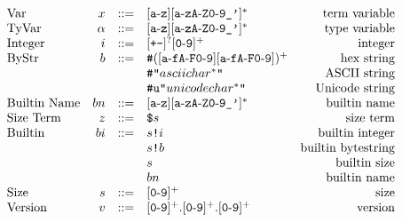 \documentclass[../main.tex]{subfiles}
\begin{document}
\begin{figure*}[t]
    \centering
    \[\begin{array}{lrclr}
        \textrm{Var}     & x  & ::= & [\texttt{a}\!\hyphen{}\!\texttt{z}][\texttt{a}\!\hyphen{}\!\texttt{zA}\!\hyphen{}\!\texttt{Z0}\!\hyphen{}\!\texttt{9\_'}]^*                                                           & \textrm{term variable}\\
        \textrm{TyVar}   & \alpha & ::= & [\texttt{a}\!\hyphen{}\!\texttt{z}][\texttt{a}\!\hyphen{}\!\texttt{zA}\!\hyphen{}\!\texttt{Z0}\!\hyphen{}\!\texttt{9\_'}]^*                                                      & \textrm{type variable}\\
        \textrm{Integer} & i  & ::= & [\texttt{+-}]^?[\texttt{0}\!\hyphen{}\!\texttt{9}]^+                                                                                                                                  & \textrm{integer}\\
        \textrm{ByStr}   & b  & ::= & \texttt{\#}([\texttt{a}\!\hyphen{}\!\texttt{fA}\!\hyphen{}\!\texttt{F0}\!\hyphen{}\!\texttt{9}][\texttt{a}\!\hyphen{}\!\texttt{fA}\!\hyphen{}\!\texttt{F0}\!\hyphen{}\!\texttt{9}])^+ & \textrm{hex string}\\
                         &    &     & \texttt{\#"}asciichar^*\texttt{"}   & \textrm{ASCII string}\\
                         &    &     & \texttt{\#u"}unicodechar^*\texttt{"}    & \textrm{Unicode string}\\
        \textrm{Builtin Name}    & bn  & ::= & [\texttt{a}\!\hyphen{}\!\texttt{z}][\texttt{a}\!\hyphen{}\!\texttt{zA}\!\hyphen{}\!\texttt{Z0}\!\hyphen{}\!\texttt{9\_'}]^*                                                          & \textrm{builtin name}\\
        \textrm{Size Term} & z  & ::= & \texttt{\$} s & \textrm{size term}\\
        \textrm{Builtin} & bi & ::= & \sizedBuiltin{s}{i} & \textrm{builtin integer}\\
                         &    &     & \sizedBuiltin{s}{b} & \textrm{builtin bytestring}\\
                         &    &     & s & \textrm{builtin size}\\
                         &    &     & bn & \textrm{builtin name}\\
        \textrm{Size} & s  & ::= & [\texttt{0}\!\hyphen{}\!\texttt{9}]^+ & \textrm{size}\\
        \textrm{Version} & v & ::= & [\texttt{0}\!\hyphen{}\!\texttt{9}]^+.[\texttt{0}\!\hyphen{}\!\texttt{9}]^+.[\texttt{0}\!\hyphen{}\!\texttt{9}]^+ & \textrm{version}\\

\end{array}\]
\end{figure*}
\end{document}
